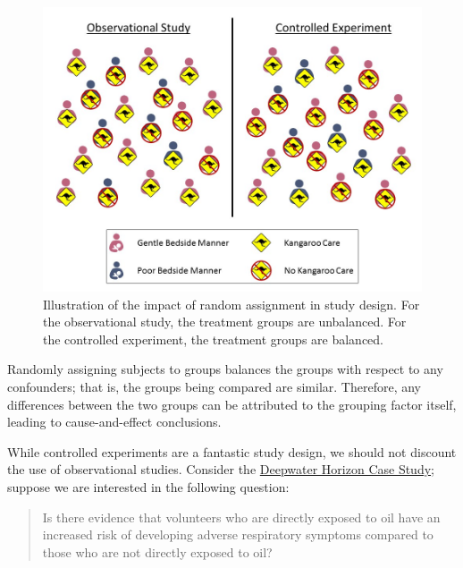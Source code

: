 \documentclass[
]{book}
\theoremstyle{plain}
\theoremstyle{mydefn}
\theoremstyle{myexmpl}
\theoremstyle{remark}
\begin{document}
\begin{figure}

{\centering \includegraphics[width=0.8\linewidth]{./images/Data-Randomization} 

}

\caption{Illustration of the impact of random assignment in study design. For the observational study, the treatment groups are unbalanced.  For the controlled experiment, the treatment groups are balanced.}\label{fig:data-randomization}
\end{figure}

\begin{rmdkeyidea}
Randomly assigning subjects to groups balances the groups with respect to any confounders; that is, the groups being compared are similar. Therefore, any differences between the two groups can be attributed to the grouping factor itself, leading to cause-and-effect conclusions.
\end{rmdkeyidea}

While controlled experiments are a fantastic study design, we should not discount the use of observational studies. Consider the \protect\hyperlink{CaseDeepwater}{Deepwater Horizon Case Study}; suppose we are interested in the following question:

\begin{quote}
Is there evidence that volunteers who are directly exposed to oil have an increased risk of developing adverse respiratory symptoms compared to those who are not directly exposed to oil?
\end{quote}
\end{document}
